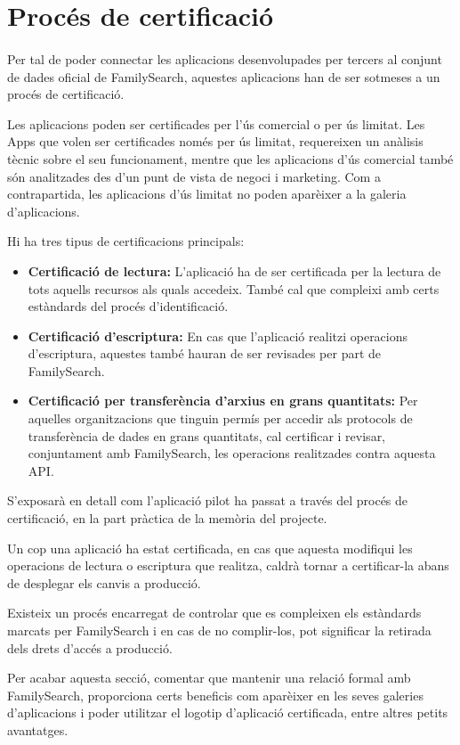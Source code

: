 \section{Procés de certificació}

    \paragraph{}
    Per tal de poder connectar les aplicacions desenvolupades per tercers al conjunt de dades oficial de FamilySearch, aquestes aplicacions han de ser sotmeses a un procés de certificació.

    Les aplicacions poden ser certificades per l'ús comercial o per ús limitat. Les Apps que volen ser certificades només per ús limitat, requereixen un anàlisis tècnic sobre el seu funcionament, mentre que les aplicacions d'ús comercial també són analitzades des d'un punt de vista de negoci i marketing. Com a contrapartida, les aplicacions d'ús limitat no poden aparèixer a la galeria d'aplicacions.

    Hi ha tres tipus de certificacions principals:

    \begin{itemize}
        \item \textbf{Certificació de lectura:} L'aplicació ha de ser certificada per la lectura de tots aquells recursos als quals accedeix. També cal que compleixi amb certs estàndards del procés d'identificació.
        \item \textbf{Certificació d'escriptura:} En cas que l'aplicació realitzi operacions d'escriptura, aquestes també hauran de ser revisades per part de FamilySearch.
        \item \textbf{Certificació per transferència d'arxius en grans quantitats:} Per aquelles organitzacions que tinguin permís per accedir als protocols de transferència de dades en grans quantitats, cal certificar i revisar, conjuntament amb Family\-Search, les operacions realitzades contra aquesta API.
    \end{itemize}

    S'exposarà en detall com l'aplicació pilot ha passat a través del procés de certificació, en la part pràctica de la memòria del projecte.

    Un cop una aplicació ha estat certificada, en cas que aquesta modifiqui les o\-pe\-ra\-cions de lectura o escriptura que realitza, caldrà tornar a certificar-la abans de desplegar els canvis a producció.

    Existeix un procés encarregat de controlar que es compleixen els estàndards marcats per FamilySearch i en cas de no complir-los, pot significar la retirada dels drets d'accés a producció.

    Per acabar aquesta secció, comentar que mantenir una relació formal amb Family\-Search, proporciona certs beneficis com aparèixer en les seves galeries d'aplicacions i poder utilitzar el logotip d'aplicació certificada, entre altres petits avantatges.
